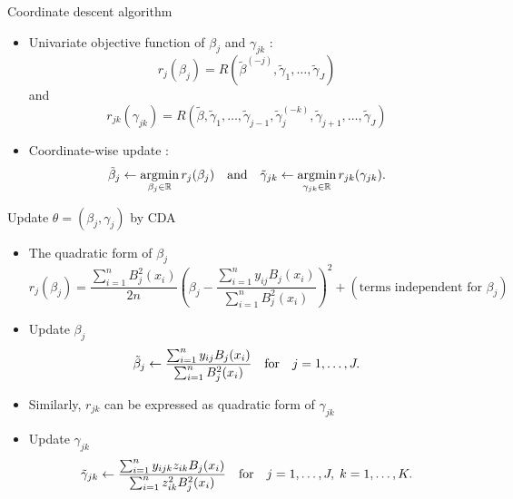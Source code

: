 \begin{frame}{Coordinate descent algorithm}
\begin{itemize}
\item Univariate objective function of $\beta_j$ and $\gamma_{jk}$ :
$$
r_j (\beta_j) = R(\tilde\beta^{(-j)},\tilde\gamma_1, \ldots, \tilde\gamma_J) 
$$
and
$$
r_{jk}(\gamma_{jk}) = R \left( \tilde\beta, \tilde\gamma_1, \ldots, \tilde\gamma_{j-1},
\tilde\gamma_j^{(-k)}, \tilde\gamma_{j+1}, \ldots, \tilde\gamma_J \right)
$$
\vspace{3mm}
\item Coordinate-wise update :
$$
\tilde\beta_j \leftarrow \operatorname*{\operatorname{argmin}}_{\beta_j \in \mathbb{R}} r_j(\beta_j)
\quad\mbox{and}\quad
\tilde\gamma_{jk} \leftarrow \operatorname*{\operatorname{argmin}}_{\gamma_{jk} \in \mathbb{R}} r_{jk}(\gamma_{jk}).
$$
\end{itemize}
\end{frame}

\begin{frame}{Update $\theta = (\beta_j, \gamma_j)$ by CDA}
\begin{itemize}
\item The quadratic form of $\beta_j$
$$
r_j(\beta_j) 
= \frac{\sum_{i=1}^n B_j^2(x_i)}{2n} \left ( \beta_j - 
\frac{\sum_{i=1}^n y_{ij} B_j(x_i)}{\sum_{i=1}^n B_j^2(x_i)} \right )^2 + (\mbox{terms independent for } \beta_j)
$$
\item Update $\beta_j$
$$
\tilde\beta_j \leftarrow \frac{\sum_{i=1}^n y_{ij} B_j(x_i)}{\sum_{i=1}^n B_j^2(x_i)} 
\quad\mbox{for}\quad j = 1, \ldots, J.
$$
\item Similarly, $r_{jk}$ can be expressed as quadratic form of $\gamma_{jk}$
\iffalse
$$
r_{jk}(\gamma_{jk})
= \frac{\sum_{i=1}^n z_{ik}^2 B_j^2(x_i)}{2n} \left \{ \gamma_{jk} - 
\frac{\sum_{i=1}^n y_{ijk} z_{ik} B_j(x_i)}{\sum_{i=1}^n z_{ik}^2 B_j^2(x_i)} \right \}^2 
+ (\mbox{terms independent for } \gamma_{jk}) 
$$
\fi
\item Update $\gamma_{jk}$
$$
\tilde\gamma_{jk} \leftarrow \frac{\sum_{i=1}^n y_{ijk} z_{ik} B_j(x_i)}{\sum_{i=1}^n z_{ik}^2 B_j^2(x_i)} 
\quad\mbox{for}\quad j = 1, \ldots, J, \; k = 1, \ldots, K.
$$
\end{itemize}
\end{frame}